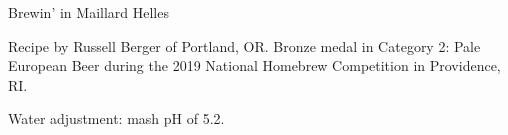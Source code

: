 \stylesection{\stylemunichhelles}

\begin{recipe}{Brewin' in Maillard Helles}

\begin{aboutblock}
Recipe by Russell Berger of Portland, OR. Bronze medal in Category 2: Pale
European Beer during the 2019 National Homebrew Competition in Providence, RI.
\sourceaha
\end{aboutblock}


\begin{methodandtiming}
 
\begin{mashsteps}
\end{mashsteps}

\begin{fermentationsteps}
\end{fermentationsteps}

\begin{directions}
Water adjustment: mash pH of 5.2.
\end{directions}

\end{methodandtiming}

\recipebreak

\begin{ingredientsblock}

\begin{malts}
\end{malts}

\begin{hops}
\end{hops}


\end{ingredientsblock}

\end{recipe}

